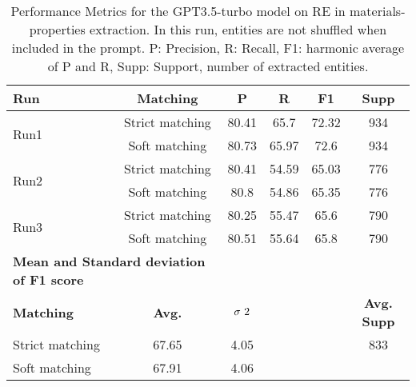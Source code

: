 \begin{table}[htbp]
  \small
  \centering
  \caption{Performance Metrics for the GPT3.5-turbo model on RE in materials-properties extraction. In this run, entities are not shuffled when included in the prompt. P: Precision, R: Recall, F1: harmonic average of P and R, Supp: Support, number of extracted entities.}
  \begin{tabular}{lccccc}
    \toprule
    \textbf{Run} & \textbf{Matching} & \textbf{P} & \textbf{R} & \textbf{F1} & \textbf{Supp} \\
    \midrule
    \multirow{2}{*}{Run1} & Strict matching & 80.41 & 65.7 & 72.32 & 934 \\
    & Soft matching & 80.73 & 65.97 & 72.6 & 934 \\
    \midrule
    \multirow{2}{*}{Run2} & Strict matching & 80.41 & 54.59 & 65.03 & 776 \\
    & Soft matching & 80.8 & 54.86 & 65.35 & 776 \\
    \midrule
    \multirow{2}{*}{Run3} & Strict matching & 80.25 & 55.47 & 65.6 & 790 \\
    & Soft matching & 80.51 & 55.64 & 65.8 & 790 \\
    \midrule
    \multicolumn{2}{l}{\textbf{Mean and Standard deviation of F1 score}} & & & & \\
    \midrule
    \textbf{Matching} & \textbf{Avg.} & $\sigma\textsuperscript{2}$ & & & \textbf{Avg. Supp}\\
    Strict matching & 67.65 & 4.05 & & & 833 \\
    Soft matching & 67.91 & 4.06 & & & \\
    \bottomrule
  \end{tabular}
\end{table}


